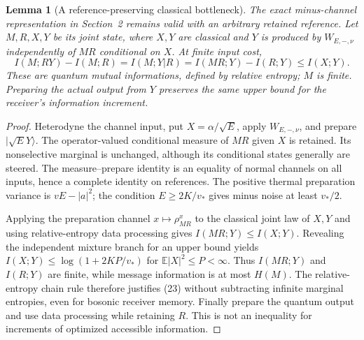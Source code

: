 \documentclass[11pt]{article}
\newtheorem{lemma}[theorem]{Lemma}
\newcommand{\E}{\mathbb E}
\begin{document}
\begin{lemma}[A reference-preserving classical bottleneck]\label{lem:reference}
The exact minus-channel representation in Section~2 remains valid with
an arbitrary retained reference. Let \(M,R,X,Y\) be its joint state,
where \(X,Y\) are classical and \(Y\) is produced by \(W_{E,-,\nu}\)
independently of \(MR\) conditional on \(X\). At finite input cost,
\[
 I(M;RY)-I(M;R)=I(M;Y|R)
   =I(MR;Y)-I(R;Y)\leq I(X;Y).                 \tag{23}
\]
These are quantum mutual informations, defined by relative entropy;
\(M\) is finite. Preparing the actual output from \(Y\) preserves the
same upper bound for the receiver's information increment.
\end{lemma}
\begin{proof}
Heterodyne the channel input, put \(X=\alpha/\sqrt E\), apply
\(W_{E,-,\nu}\), and prepare \(|\sqrt E Y\rangle\).
The operator-valued conditional measure of \(MR\) given \(X\) is
retained. Its nonselective marginal is unchanged, although its conditional
states generally are steered. The measure--prepare identity is an equality
of normal channels on all inputs, hence a complete identity on references.
The positive thermal preparation variance is \(vE-|a|^2\); the condition
\(E\geq2K/v_*\) gives minus noise at least \(v_*/2\).

Applying the preparation channel \(x\mapsto\rho_{MR}^x\) to the classical
joint law of \(X,Y\) and using relative-entropy data processing gives
\(I(MR;Y)\leq I(X;Y)\). Revealing the independent mixture branch for
an upper bound yields
\(I(X;Y)\leq\log(1+2KP/v_*)\) for \(\E|X|^2\leq P<\infty\).
Thus \(I(MR;Y)\) and \(I(R;Y)\) are finite, while message information
is at most \(H(M)\). The relative-entropy chain rule therefore justifies
(23) without subtracting infinite marginal entropies, even for bosonic
receiver memory. Finally prepare the quantum output and use data
processing while retaining \(R\). This is not an inequality for increments
of optimized accessible information.
\end{proof}
\end{document}
